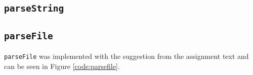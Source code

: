 \subsection{\texttt{parseString}}

\subsection{\texttt{parseFile}}
\texttt{parseFile} was implemented with the suggestion from the assignment text
and can be seen in Figure \ref{code:parsefile}.

